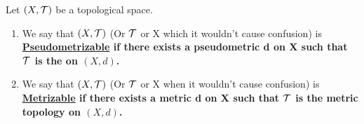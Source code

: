 \newcommand{\Pseudometrizable}[0]{
    \bf \hyperref[def:Pseudometrizable]{Pseudometrizable} \rm
}
\newcommand{\Metrizable}[0]{
    \bf \hyperref[def:Pseudometrizable]{Metrizable} \rm 
}
\begin{df}
    \label{def:Pseudometrizable}
    Let $(X,\mathcal{T})$ be a topological space. 
    \begin{enumerate}
        \item We say that $(X,\mathcal{T})$ (Or $\mathcal{T}$ or X which it wouldn't cause confusion) is \Pseudometrizable if there exists a pseudometric d on X such that $\mathcal{T}$ is the \PseudometricInducedTopology on $(X,d)$. 
        \item We say that $(X,\mathcal{T})$ (Or $\mathcal{T}$ or X when it wouldn't cause confusion) is \Metrizable if there exists a metric d on X such that $\mathcal{T}$ is the metric topology on $(X,d)$. 
    \end{enumerate}
\end{df}